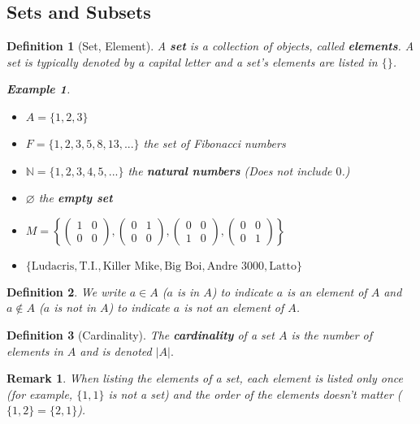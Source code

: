 \documentclass[12pt,a4paper]{article}
\newtheorem{df}{Definition}[subsection]
\newtheorem{eg}{Example}[subsection]
\newtheorem*{rmk}{\indent Remark}
\def\N{{\mathbb{N}}}
\def\emptyset{\varnothing}
\begin{document}
\subsection{Sets and Subsets}
\begin{df}[Set, Element]
	A \textbf{set} is a collection of objects, called \textbf{elements}. A set is typically denoted by a capital letter and a set's elements are listed in $\{\}$.
	\begin{eg}
	\begin{itemize}
		\item $A=\{1,2,3\}$
		\item $F=\{1,2,3,5,8,13,...\}$ the set of Fibonacci numbers
		\item $\N=\{1,2,3,4,5,...\}$ the \textbf{natural numbers} (Does not include $0$.)
		\item $\emptyset$ the \textbf{empty set}
		\item $M=\left\{\begin{pmatrix}1&0\\0&0\end{pmatrix},\begin{pmatrix}0&1\\0&0\end{pmatrix},\begin{pmatrix}0&0\\1&0\end{pmatrix},\begin{pmatrix}0&0\\0&1\end{pmatrix}\right\}$
		\item $\{\text{Ludacris},\text{T.I.},\text{Killer Mike},\text{Big Boi},\text{Andre 3000},\text{Latto}\}$
	\end{itemize}	
	\end{eg}
\end{df}
\begin{df}
	We write $a\in A$ ($a$ is in $A$) to indicate $a$ is an element of $A$ and $a\notin A$ ($a$ is not in $A$) to indicate $a$ is not an element of $A$.	
\end{df}
\begin{df}[Cardinality]
	The \textbf{cardinality} of a set $A$ is the number of elements in $A$ and is denoted $|A|.$
\end{df}
\begin{rmk} When listing the elements of a set, each element is listed only once (for example, $\{1,1\}$ is not a set) and the order of the elements doesn't matter ($\{1,2\}=\{2,1\}$). \end{rmk}
\end{document}
